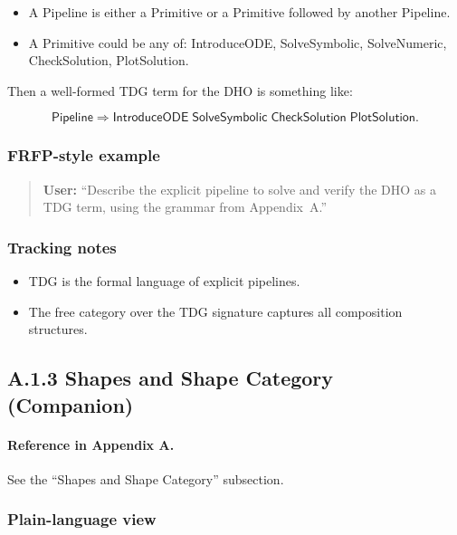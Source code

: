 \begin{itemize}
 \item A \textsf{Pipeline} is either a \textsf{Primitive} or a
 \textsf{Primitive} followed by another \textsf{Pipeline}.
 \item A \textsf{Primitive} could be any of:
 \textsf{IntroduceODE}, \textsf{SolveSymbolic}, \textsf{SolveNumeric}, \textsf{CheckSolution},
 \textsf{PlotSolution}.
\end{itemize}

Then a well-formed TDG term for the DHO is something like:

\[
\textsf{Pipeline} \Rightarrow \textsf{IntroduceODE}\;\textsf{SolveSymbolic}\;\textsf{CheckSolution}\;\textsf{PlotSolution}.
\]

\subsubsection*{FRFP-style example}

\begin{quote}
\textbf{User:} 
``Describe the explicit pipeline to solve and verify the DHO as a TDG term, using the grammar from Appendix~A.'' 
\end{quote}

\subsubsection*{Tracking notes}

\begin{itemize}
 \item TDG is the formal language of explicit pipelines.
 \item The free category over the TDG signature captures all composition structures.
\end{itemize}

\newpage

\subsection{A.1.3 Shapes and Shape Category (Companion)}

\paragraph{Reference in Appendix A.}
See the ``Shapes and Shape Category'' subsection.

\subsubsection*{Plain-language view}

